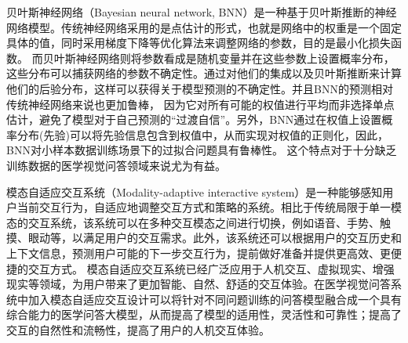 贝叶斯神经网络（Bayesian neural network, BNN）是一种基于贝叶斯推断的神经网络模型。传统神经网络采用的是点估计的形式，也就是网络中的权重是一个固定具体的值，同时采用梯度下降等优化算法来调整网络的参数，目的是最小化损失函数。
而贝叶斯神经网络则将参数看成是随机变量并在这些参数上设置概率分布，这些分布可以捕获网络的参数不确定性。通过对他们的集成以及贝叶斯推断来计算他们的后验分布，这样可以获得关于模型预测的不确定性。并且BNN的预测相对传统神经网络来说也更加鲁棒，
因为它对所有可能的权值进行平均而非选择单点估计，避免了模型对于自己预测的“过渡自信”。另外，BNN通过在权值上设置概率分布(先验)可以将先验信息包含到权值中，从而实现对权值的正则化，因此，BNN对小样本数据训练场景下的过拟合问题具有鲁棒性。
这个特点对于十分缺乏训练数据的医学视觉问答领域来说尤为有益。

模态自适应交互系统（Modality-adaptive interactive system）是一种能够感知用户当前交互行为，自适应地调整交互方式和策略的系统。相比于传统局限于单一模态的交互系统，该系统可以在多种交互模态之间进行切换，例如语音、手势、触摸、眼动等，以满足用户的交互需求。此外，该系统还可以根据用户的交互历史和上下文信息，预测用户可能的下一步交互行为，提前做好准备并提供更高效、更便捷的交互方式。
模态自适应交互系统已经广泛应用于人机交互、虚拟现实、增强现实等领域，为用户带来了更加智能、自然、舒适的交互体验。在医学视觉问答系统中加入模态自适应交互设计可以将针对不同问题训练的问答模型融合成一个具有综合能力的医学问答大模型，从而提高了模型的适用性，灵活性和可靠性；提高了交互的自然性和流畅性，提高了用户的人机交互体验。

